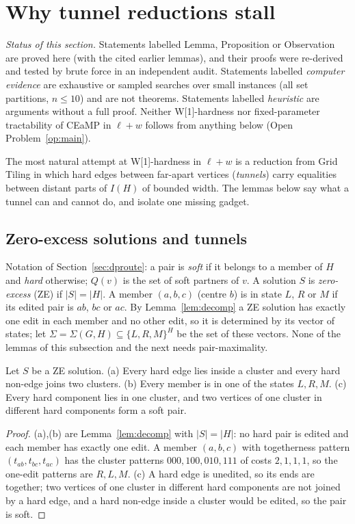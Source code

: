 \section{Why tunnel reductions stall}\label{sec:tunnels}
\emph{Status of this section.} Statements labelled Lemma, Proposition or Observation are proved here (with the cited earlier lemmas), and their proofs were re-derived and tested by brute force in an independent audit. Statements labelled \emph{computer evidence} are exhaustive or sampled searches over small instances (all set partitions, $n\le10$) and are not theorems. Statements labelled \emph{heuristic} are arguments without a full proof. Neither W[1]-hardness nor fixed-parameter tractability of CEaMP in $\ell+w$ follows from anything below (Open Problem~\ref{op:main}).

The most natural attempt at W[1]-hardness in $\ell+w$ is a reduction from Grid Tiling in which hard edges between far-apart vertices (\emph{tunnels}) carry equalities between distant parts of $I(H)$ of bounded width. The lemmas below say what a tunnel can and cannot do, and isolate one missing gadget.

\subsection{Zero-excess solutions and tunnels}
Notation of Section~\ref{sec:dproute}: a pair is \emph{soft} if it belongs to a member of $H$ and \emph{hard} otherwise; $Q(v)$ is the set of soft partners of $v$. A solution $S$ is \emph{zero-excess} (ZE) if $|S|=|H|$. A member $(a,b,c)$ (centre $b$) is in state $L$, $R$ or $M$ if its edited pair is $ab$, $bc$ or $ac$. By Lemma~\ref{lem:decomp} a ZE solution has exactly one edit in each member and no other edit, so it is determined by its vector of states; let $\Sigma=\Sigma(G,H)\subseteq\{L,R,M\}^H$ be the set of these vectors. None of the lemmas of this subsection and the next needs pair-maximality.

\begin{lemma}\label{lem:tZE}
Let $S$ be a ZE solution. (a) Every hard edge lies inside a cluster and every hard non-edge joins two clusters. (b) Every member is in one of the states $L,R,M$. (c) Every hard component lies in one cluster, and two vertices of one cluster in different hard components form a soft pair.
\end{lemma}
\begin{proof}
(a),(b) are Lemma~\ref{lem:decomp} with $|S|=|H|$: no hard pair is edited and each member has exactly one edit. A member $(a,b,c)$ with togetherness pattern $(t_{ab},t_{bc},t_{ac})$ has the cluster patterns $000,100,010,111$ of costs $2,1,1,1$, so the one-edit patterns are $R,L,M$. (c) A hard edge is unedited, so its ends are together; two vertices of one cluster in different hard components are not joined by a hard edge, and a hard non-edge inside a cluster would be edited, so the pair is soft.
\end{proof}

